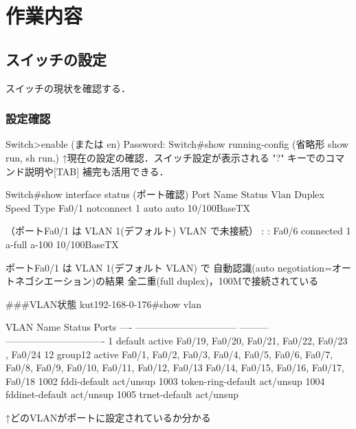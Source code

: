\section{作業内容}

\subsection{スイッチの設定}

スイッチの現状を確認する．

\subsubsection{設定確認}

\begin{cli}
Switch>enable  (または en)
Password:
Switch#show running-config  (省略形 show run, sh run,)
       ↑現在の設定の確認．スイッチ設定が表示される
      "?" キーでのコマンド説明や[TAB] 補完も活用できる．

Switch#show interface status (ポート確認)
Port      Name               Status       Vlan       Duplex  Speed Type
Fa0/1                        notconnect   1            auto   auto
 10/100BaseTX

（ポートFa0/1 は VLAN 1(デフォルト) VLAN で未接続）
             :
             :
Fa0/6                        connected    1          a-full  a-100
 10/100BaseTX

ポートFa0/1 は VLAN 1(デフォルト VLAN) で 自動認識(auto negotiation=オートネゴシエーション)の結果 全二重(full duplex)，100Mで接続されている


###VLAN状態
kut192-168-0-176#show vlan

VLAN Name                             Status    Ports
---- -------------------------------- --------- -------------------------------
1    default                          active    Fa0/19, Fa0/20, Fa0/21, Fa0/22, Fa0/23
, Fa0/24
12   group12                          active    Fa0/1, Fa0/2, Fa0/3, Fa0/4, Fa0/5,
Fa0/6, Fa0/7, Fa0/8, Fa0/9, Fa0/10, Fa0/11, Fa0/12, Fa0/13
                                                Fa0/14, Fa0/15, Fa0/16, Fa0/17, Fa0/18
1002 fddi-default                     act/unsup
1003 token-ring-default               act/unsup
1004 fddinet-default                  act/unsup
1005 trnet-default                    act/unsup

↑どのVLANがポートに設定されているか分かる

\end{cli}

